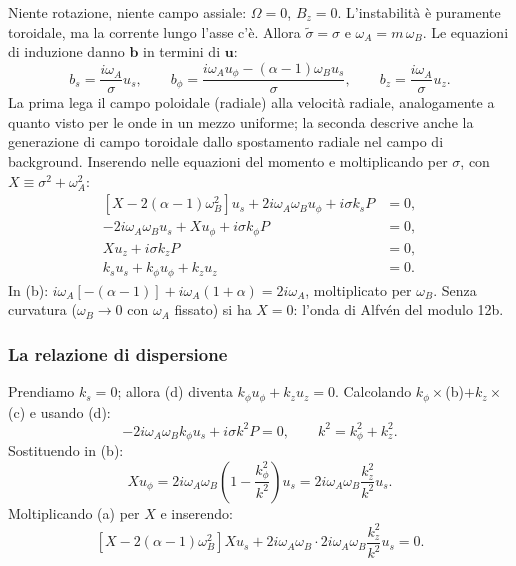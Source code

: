 Niente rotazione, niente campo assiale: $\Omega=0$, $B_z=0$. L'instabilità è puramente toroidale, ma la corrente lungo l'asse c'è. Allora $\tilde\sigma=\sigma$ e $\omega_A=m\,\omega_B$. Le equazioni di induzione danno $\mathbf{b}$ in termini di $\mathbf{u}$:
\begin{equation}
b_s=\frac{i\omega_A}{\sigma}u_s,\qquad b_\phi=\frac{i\omega_Au_\phi-(\alpha-1)\omega_Bu_s}{\sigma},\qquad b_z=\frac{i\omega_A}{\sigma}u_z .
\end{equation}
La prima lega il campo poloidale (radiale) alla velocità radiale, analogamente a quanto visto per le onde in un mezzo uniforme; la seconda descrive anche la generazione di campo toroidale dallo spostamento radiale nel campo di background. Inserendo nelle equazioni del momento e moltiplicando per $\sigma$, con $X\equiv\sigma^2+\omega_A^2$:
\begin{align}
\left[X-2(\alpha-1)\omega_B^2\right]u_s+2i\omega_A\omega_Bu_\phi+i\sigma k_sP&=0,\tag{a}\\
-2i\omega_A\omega_Bu_s+Xu_\phi+i\sigma k_\phi P&=0,\tag{b}\\
Xu_z+i\sigma k_zP&=0,\tag{c}\\
k_su_s+k_\phi u_\phi+k_zu_z&=0.\tag{d}
\end{align}
In (b): $i\omega_A[-(\alpha-1)]+i\omega_A(1+\alpha)=2i\omega_A$, moltiplicato per $\omega_B$. Senza curvatura ($\omega_B\to0$ con $\omega_A$ fissato) si ha $X=0$: l'onda di Alfvén del modulo 12b.

\subsubsection{La relazione di dispersione}

Prendiamo $k_s=0$; allora (d) diventa $k_\phi u_\phi+k_zu_z=0$. Calcolando $k_\phi\times$(b)$+k_z\times$(c) e usando (d):
\begin{equation}
-2i\omega_A\omega_Bk_\phi u_s+i\sigma k^2P=0,\qquad k^2=k_\phi^2+k_z^2 .
\end{equation}
Sostituendo in (b):
\begin{equation}
Xu_\phi=2i\omega_A\omega_B\left(1-\frac{k_\phi^2}{k^2}\right)u_s=2i\omega_A\omega_B\frac{k_z^2}{k^2}u_s .
\end{equation}
Moltiplicando (a) per $X$ e inserendo:
\begin{equation}
\left[X-2(\alpha-1)\omega_B^2\right]Xu_s+2i\omega_A\omega_B\cdot2i\omega_A\omega_B\frac{k_z^2}{k^2}u_s=0 .
\end{equation}

